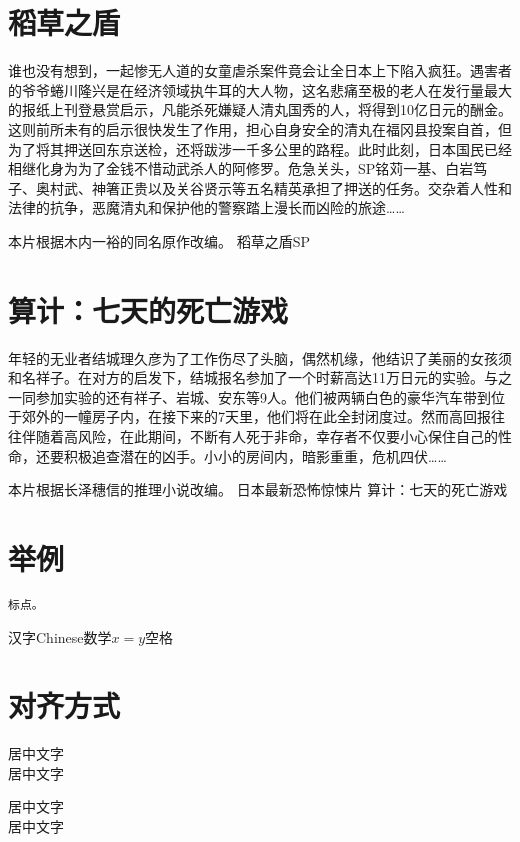 \documentclass[11pt,a4paper]{article}
\begin{document}
\noindent
{}
\setlength{\hangindent}{2em}

\section{稻草之盾}
谁也没有想到，一起惨无人道的女童虐杀案件竟会让全日本上下陷入疯狂。遇害者的爷爷蜷川隆兴是在经济领域执牛耳的大人物，这名悲痛至极的老人在发行量最大的报纸上刊登悬赏启示，凡能杀死嫌疑人清丸国秀的人，将得到10亿日元的酬金。这则前所未有的启示很快发生了作用，担心自身安全的清丸在福冈县投案自首，但为了将其押送回东京送检，还将跋涉一千多公里的路程。此时此刻，日本国民已经相继化身为为了金钱不惜动武杀人的阿修罗。危急关头，SP铭苅一基、白岩笃子、奥村武、神箸正贵以及关谷贤示等五名精英承担了押送的任务。交杂着人性和法律的抗争，恶魔清丸和保护他的警察踏上漫长而凶险的旅途……

本片根据木内一裕的同名原作改编。
稻草之盾SP

\section{算计：七天的死亡游戏}
年轻的无业者结城理久彦为了工作伤尽了头脑，偶然机缘，他结识了美丽的女孩须和名祥子。在对方的启发下，结城报名参加了一个时薪高达11万日元的实验。与之一同参加实验的还有祥子、岩城、安东等9人。他们被两辆白色的豪华汽车带到位于郊外的一幢房子内，在接下来的7天里，他们将在此全封闭度过。然而高回报往往伴随着高风险，在此期间，不断有人死于非命，幸存者不仅要小心保住自己的性命，还要积极追查潜在的凶手。小小的房间内，暗影重重，危机四伏……

本片根据长泽穗信的推理小说改编。
日本最新恐怖惊悚片 算计：七天的死亡游戏
\section{举例}
\begin{verbatim}
标点。
\end{verbatim}
 
汉字Chinese数学$x=y$空格


\section{对齐方式}
\begin{center}
居中文字 \\
居中文字
\end{center}
 
\noindent
\begin{minipage}{\linewidth}
\centering
居中文字 \\
居中文字
\end{minipage}
 
\end{document}
